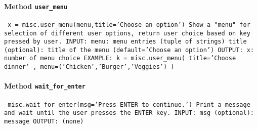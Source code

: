 \paragraph{Method \texttt{user_menu}}
\vspace{1ex}
\texttt{\newline
x = misc.user_menu(menu,title='Choose an option')\newline
\newline
Show a "menu" for selection of different user options, return user choice based on key pressed by user.\newline
\newline
INPUT:\newline
menu: menu entries (tuple of strings)\newline
title (optional): title of the menu (default='Choose an option')\newline
\newline
OUTPUT:\newline
x: number of menu choice\newline
\newline
EXAMPLE:\newline
k = misc.user_menu( title='Choose dinner' , menu=('Chicken','Burger','Veggies') )\newline
\newline
}

\paragraph{Method \texttt{wait_for_enter}}
\vspace{1ex}
\texttt{\newline
misc.wait_for_enter(msg='Press ENTER to continue.')\newline
\newline
Print a message and wait until the user presses the ENTER key.\newline
\newline
INPUT:\newline
msg (optional): message\newline
\newline
OUTPUT:\newline
(none)\newline
\newline
}

